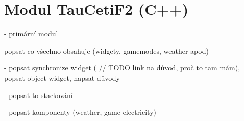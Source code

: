 
\section{Modul TauCetiF2 (C++)}
- primární modul

popsat co všechno obsahuje (widgety, gamemodes, weather apod)

- popsat synchronize widget ( // TODO link na důvod, proč to tam mám), popsat object widget, napsat důvody

- popsat to stackování 

- popsat komponenty
(weather, game electricity)